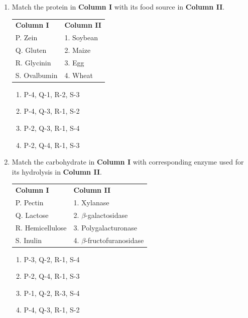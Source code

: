 \documentclass[journal,12pt,onecolumn]{IEEEtran}
\begin{document}
\begin{enumerate}[label=\arabic*.,resume]

\item Match the protein in \textbf{Column I} with its food source in \textbf{Column II}.
\begin{table}[H]
\centering
\begin{tabular}{ll}
\textbf{Column I} & \textbf{Column II} \\
P. Zein & 1. Soybean \\
Q. Gluten & 2. Maize \\
R. Glycinin & 3. Egg \\
S. Ovalbumin & 4. Wheat \\
\end{tabular}
\end{table}

\begin{multicols}{2}
\begin{enumerate}[label=(\Alph*)]
\item P-4, Q-1, R-2, S-3
\item P-4, Q-3, R-1, S-2
\item P-2, Q-3, R-1, S-4
\item P-2, Q-4, R-1, S-3
\end{enumerate}
\end{multicols}

\item Match the carbohydrate in \textbf{Column I} with corresponding enzyme used for its hydrolysis in \textbf{Column II}.
\begin{table}[H]
\centering
\begin{tabular}{ll}
\textbf{Column I} & \textbf{Column II} \\
P. Pectin & 1. Xylanase \\
Q. Lactose & 2. $\beta$-galactosidase \\
R. Hemicellulose & 3. Polygalacturonase \\
S. Inulin & 4. $\beta$-fructofuranosidase \\
\end{tabular}
\end{table}

\begin{multicols}{2}
\begin{enumerate}[label=(\Alph*)]
\item P-3, Q-2, R-1, S-4
\item P-2, Q-4, R-1, S-3
\item P-1, Q-2, R-3, S-4
\item P-4, Q-3, R-1, S-2
\end{enumerate}
\end{multicols}


\end{enumerate}
\end{document}
